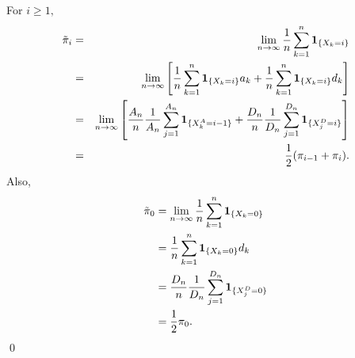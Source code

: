 	For $i \geq 1,$
	\begin{eqnarray*}
	\tilde{\pi}_i &=& \lim_{n \rightarrow \infty} \frac{1}{n} \sum_{k = 1}^n
	\boldsymbol{1}_{ \{ X_k = i \} }\\
	&=& \lim_{n \rightarrow \infty} \left[ \frac{1}{n} \sum_{k = 1}^n \boldsymbol{1}_{ \{ X_k = i \} } a_k
	+ \frac{1}{n} \sum_{k = 1}^n \boldsymbol{1}_{ \{ X_k = i \} } d_k \right]\\
	&=& \lim_{n \rightarrow \infty} \left[ \frac{A_n}{n} \frac{1}{A_n}\sum_{j = 1}^{A_n} \boldsymbol{1}_{ \{ X^A_k = i-1 \} } 
	+ \frac{D_n}{n} \frac{1}{D_n} \sum_{j = 1}^{D_n} \boldsymbol{1}_{ \{ X^D_j = i \} } \right]\\
	&=& \frac{1}{2} (\pi_{i-1} + \pi_i). 
	\end{eqnarray*}
Also,	
	\begin{align*}
	\tilde{\pi}_0 &= \lim_{n \rightarrow \infty} \frac{1}{n} \sum_{k = 1}^n
	\boldsymbol{1}_{ \{ X_k = 0 \} }\\
	&= \frac{1}{n} \sum_{k = 1}^n \boldsymbol{1}_{ \{ X_k = 0 \} } d_k \\
	&= \frac{D_n}{n} \frac{1}{D_n} \sum_{j = 1}^{D_n} \boldsymbol{1}_{ \{ X^D_j = 0 \} } \\
	&= \frac{1}{2} \pi_0. 
	\end{align*}
	\qed
	




%
%

